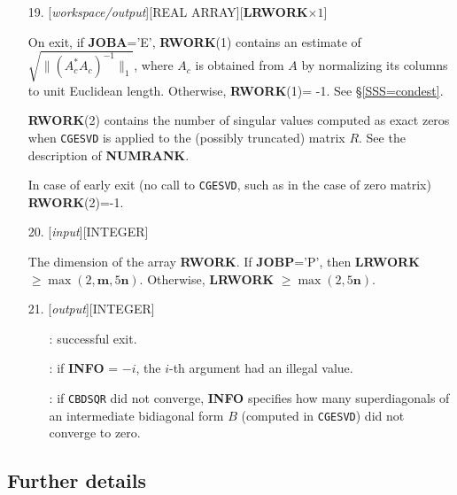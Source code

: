\documentclass[12pt, a4paper, final]{article}
\numberwithin{equation}{section}
\begin{document}
\begin{itemize}
	\item[19.]  [\emph{workspace/output}][{\sc REAL ARRAY}][\textbf{LRWORK}$\times 1$]
	
	On exit, if \textbf{JOBA}='E', \textbf{RWORK}(1) contains an estimate  of $\sqrt{\|(A_c^* A_c)^{-1}\|_1}$, where $A_c$ is obtained from $A$ by normalizing its columns to unit Euclidean length. Otherwise, 
	\textbf{RWORK}(1)= -1. See \S \ref{SSS=condest}.
	
	\textbf{RWORK}(2) contains the number of singular values computed as exact zeros when \texttt{CGESVD} is applied to the (possibly truncated) matrix $R$. See the description of \textbf{NUMRANK}.
	
	In case of early exit (no call to \texttt{CGESVD}, such as in the case of zero matrix) \textbf{RWORK}(2)=-1.
	
	\item[20.]  [\emph{input}][{\sc INTEGER}]
	
	The dimension of the array \textbf{RWORK}.
	If \textbf{JOBP}='P', then {\textbf{LRWORK} $\geq \max(2, \mathbf{m}, 5\mathbf{n})$}. Otherwise, {\textbf{LRWORK} $\geq \max(2, 5\mathbf{n})$}.
	\item[21.]   [\emph{output}][{\sc INTEGER}]
	\begin{itemize}
		\item[\framebox{$=0$}]:  successful exit.
		\item[\framebox{$<0$}]:  if \textbf{INFO} = $-i$, the $i$-th argument had an illegal value.
		\item[\framebox{$>0$}]:  if \texttt{CBDSQR} did not converge, \textbf{INFO} specifies how many superdiagonals of an intermediate bidiagonal form $B$ (computed in \texttt{CGESVD}) did not converge to zero.
	\end{itemize}
\end{itemize}

\subsection{Further details}
\end{document}
